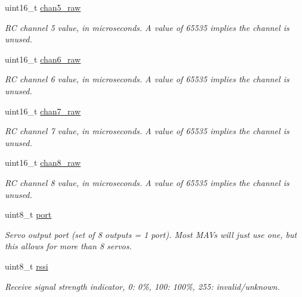 \begin{DoxyCompactItemize}
uint16\+\_\+t \hyperlink{struct____mavlink__rc__channels__raw__t_add8ae2761f8b65c92d0d2cc4f2e836fd}{chan5\+\_\+raw}
\begin{DoxyCompactList}\small\item\em R\+C channel 5 value, in microseconds. A value of 65535 implies the channel is unused. \end{DoxyCompactList}\item 
uint16\+\_\+t \hyperlink{struct____mavlink__rc__channels__raw__t_a4f2114cbf6637d9b0c661f08d54c9958}{chan6\+\_\+raw}
\begin{DoxyCompactList}\small\item\em R\+C channel 6 value, in microseconds. A value of 65535 implies the channel is unused. \end{DoxyCompactList}\item 
uint16\+\_\+t \hyperlink{struct____mavlink__rc__channels__raw__t_a6cccd33a0b2b888a3671e66e0c88d799}{chan7\+\_\+raw}
\begin{DoxyCompactList}\small\item\em R\+C channel 7 value, in microseconds. A value of 65535 implies the channel is unused. \end{DoxyCompactList}\item 
uint16\+\_\+t \hyperlink{struct____mavlink__rc__channels__raw__t_ac4181e5b2c297dbe24431a4ca1d1493e}{chan8\+\_\+raw}
\begin{DoxyCompactList}\small\item\em R\+C channel 8 value, in microseconds. A value of 65535 implies the channel is unused. \end{DoxyCompactList}\item 
\hypertarget{struct____mavlink__rc__channels__raw__t_a3d166207003ffe9bfc68b3461ae1f03c}{uint8\+\_\+t \hyperlink{struct____mavlink__rc__channels__raw__t_a3d166207003ffe9bfc68b3461ae1f03c}{port}}\label{struct____mavlink__rc__channels__raw__t_a3d166207003ffe9bfc68b3461ae1f03c}

\begin{DoxyCompactList}\small\item\em Servo output port (set of 8 outputs = 1 port). Most M\+A\+Vs will just use one, but this allows for more than 8 servos. \end{DoxyCompactList}\item 
\hypertarget{struct____mavlink__rc__channels__raw__t_a23cda9263105190c2278e2bb1264a886}{uint8\+\_\+t \hyperlink{struct____mavlink__rc__channels__raw__t_a23cda9263105190c2278e2bb1264a886}{rssi}}\label{struct____mavlink__rc__channels__raw__t_a23cda9263105190c2278e2bb1264a886}

\begin{DoxyCompactList}\small\item\em Receive signal strength indicator, 0\+: 0\%, 100\+: 100\%, 255\+: invalid/unknown. \end{DoxyCompactList}\end{DoxyCompactItemize}


